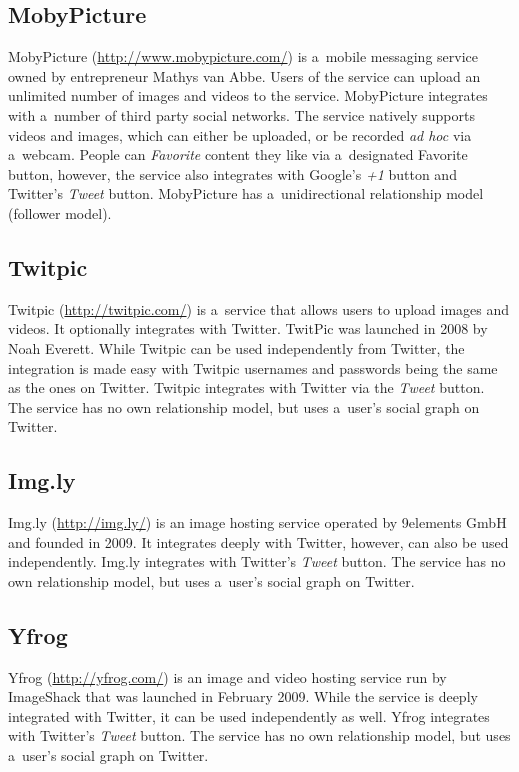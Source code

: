 \subsection{MobyPicture}

MobyPicture (\url{http://www.mobypicture.com/})
is a~mobile messaging service
owned by entrepreneur Mathys van Abbe.
Users of the service can upload an unlimited number of
images and videos to the service.
MobyPicture integrates with a~number of
third party social networks.
The service natively supports videos and images,
which can either be uploaded, or be recorded \emph{ad hoc}
via a~webcam.
People can \emph{Favorite} content they like via
a~designated Favorite button,
however, the service also integrates with Google's
\emph{+1} button and Twitter's \emph{Tweet} button. 
MobyPicture has a~unidirectional relationship model
(follower model).

\subsection{Twitpic}

Twitpic (\url{http://twitpic.com/})
is a~service that allows users to upload images and videos.
It optionally integrates with Twitter.
TwitPic was launched in 2008 by Noah Everett.
While Twitpic can be used independently from Twitter,
the integration is made easy with Twitpic usernames and passwords
being the same as the ones on Twitter.
Twitpic integrates with Twitter via the \emph{Tweet} button.
The service has no own relationship model,
but uses a~user's social graph on Twitter.

\subsection{Img.ly}

Img.ly (\url{http://img.ly/})
is an image hosting service operated by 9elements GmbH
and founded in 2009.
It integrates deeply with Twitter, however,
can also be used independently.
Img.ly integrates with Twitter's \emph{Tweet} button. 
The service has no own relationship model,
but uses a~user's social graph on Twitter.

\subsection{Yfrog}

Yfrog (\url{http://yfrog.com/})
is an image and video hosting service run by ImageShack
that was launched in February 2009.
While the service is deeply integrated with Twitter,
it can be used independently as well.
Yfrog integrates with Twitter's \emph{Tweet} button.
The service has no own relationship model,
but uses a~user's social graph on Twitter.

